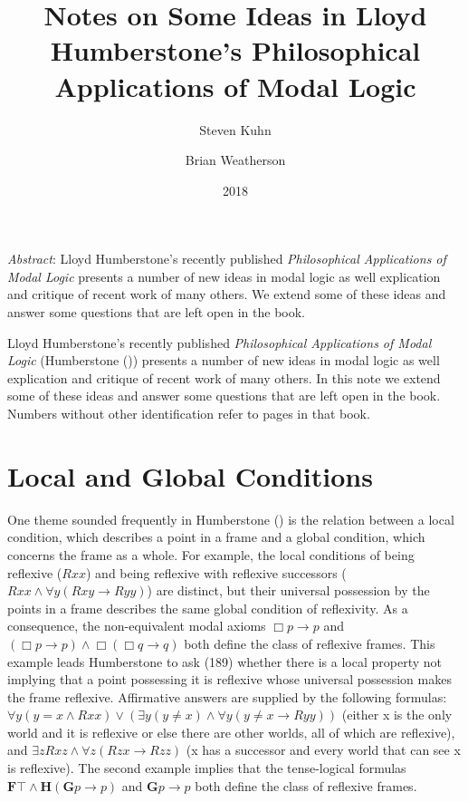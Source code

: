 \documentclass[
  11pt,
  letterpaper,
  DIV=11,
  numbers=noendperiod,
  twoside]{scrartcl}
\title{Notes on Some Ideas in Lloyd Humberstone's Philosophical
Applications of Modal Logic}
\author{Steven Kuhn \and Brian Weatherson}
\date{2018}
\renewenvironment{abstract}
 {\vspace{-1.25cm}
 \quotation\small\noindent\emph{Abstract}:}
 {\endquotation}
\begin{document}
\maketitle
\begin{abstract}
Lloyd Humberstone's recently published \emph{Philosophical Applications
of Modal Logic} presents a number of new ideas in modal logic as well
explication and critique of recent work of many others. We extend some
of these ideas and answer some questions that are left open in the book.
\end{abstract}


Lloyd Humberstone's recently published \emph{Philosophical Applications
of Modal Logic} (Humberstone ())
presents a number of new ideas in modal logic as well explication and
critique of recent work of many others. In this note we extend some of
these ideas and answer some questions that are left open in the book.
Numbers without other identification refer to pages in that book.

\section{Local and Global Conditions}\label{local-and-global-conditions}

One theme sounded frequently in Humberstone
() is the relation between a local
condition, which describes a point in a frame and a global condition,
which concerns the frame as a whole. For example, the local conditions
of being reflexive (\(Rxx\)) and being reflexive with reflexive
successors (\(Rxx \land \forall y(Rxy \rightarrow Ryy)\)) are distinct,
but their universal possession by the points in a frame describes the
same global condition of reflexivity. As a consequence, the
non-equivalent modal axioms \(\Box p\rightarrow p\) and
\((\Box p\rightarrow p) \land \Box(\Box q\rightarrow q)\) both define
the class of reflexive frames. This example leads Humberstone to ask
(189) whether there is a local property not implying that a point
possessing it is reflexive whose universal possession makes the frame
reflexive. Affirmative answers are supplied by the following formulas:
\(\forall y(y{=}x\wedge Rxx) \vee (\exists y(y\ne x) \wedge \forall y(y\ne x \rightarrow Ryy))\)
(either x is the only world and it is reflexive or else there are other
worlds, all of which are reflexive), and
\(\exists zRxz \wedge \forall z(Rzx \rightarrow Rzz)\) (x has a
successor and every world that can see x is reflexive). The second
example implies that the tense-logical formulas
\({\mathbf{F}}\top \wedge \mathbf{H}(\mathbf{G}p\rightarrow p)\) and
\(\mathbf{G}p\rightarrow p\) both define the class of reflexive frames.
\end{document}
